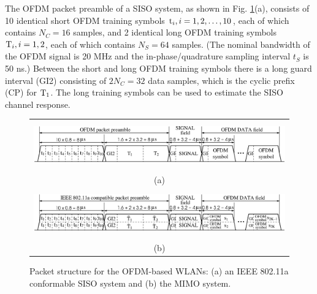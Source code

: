 \documentclass[11pt,draftnofoot,onecolumn]{IEEEtran}
\begin{document}
The OFDM packet preamble of a SISO system, as shown in Fig. \ref{fig_ofdmpacket}(a),
consists of 10 identical short OFDM training
symbols ${\rm t}_i, i = 1, 2, \dots, 10$, each of which contains
$N_C = 16$ samples, and 2 identical long
OFDM training symbols ${\rm T}_i, i = 1, 2$, each of which contains
$N_S = 64$ samples.
(The nominal bandwidth of the OFDM signal is 20 MHz and
the in-phase/quadrature sampling interval $t_S$ is 50 ns.)
Between the short and long OFDM training symbols there is a
long guard interval (GI2) consisting of $2N_C = 32$ data samples, which
is the cyclic prefix (CP) for ${\rm T}_1$.
The long training symbols can be used to estimate the SISO
channel response.

\begin{figure}[t]
\centering
\begin{tabular}{c}
\includegraphics[height=0.8in]{fig/ofdmpacket_n.eps} \\
{\small (a)}\\
\includegraphics[height=0.8in]{fig/mimopac_short_t.eps} \\
{\small (b)}
\end{tabular}
\caption{Packet structure for the OFDM-based WLANs: (a) an
IEEE 802.11a conformable SISO system and (b) the MIMO system.}
\label{fig_ofdmpacket}
\end{figure}
\end{document}
